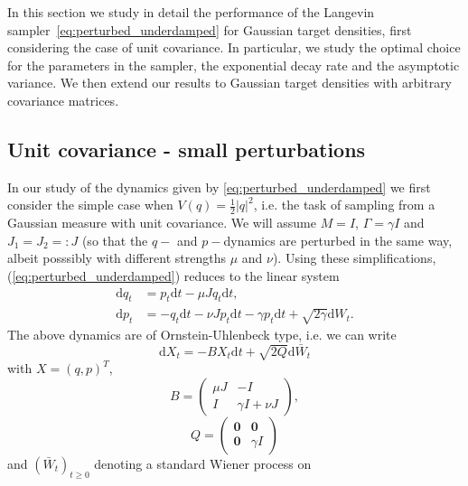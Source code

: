 
In this section we study in detail the performance of the Langevin sampler~\eqref{eq:perturbed_underdamped} for Gaussian target densities, first considering the case of unit covariance. In particular, we study the optimal choice for the parameters in the sampler, the exponential decay rate and the asymptotic variance. We then extend our results to Gaussian target densities with arbitrary covariance matrices.

\subsection{Unit covariance - small perturbations}
\label{sec:small perturbations}

In our study of the dynamics given by \eqref{eq:perturbed_underdamped}
we first consider the simple case when $V(q)=\frac{1}{2}\vert q\vert^{2}$,
i.e. the task of sampling from a Gaussian measure with unit covariance.
We will assume $M=I$, $\Gamma=\gamma I$ and $J_{1}=J_{2}=:J$
(so that the $q-$ and $p-$dynamics are perturbed in the same way,
albeit posssibly with different strengths $\mu$ and $\nu$). Using
these simplifications, (\ref{eq:perturbed_underdamped})
reduces to the linear system 
\begin{align}
\mathrm{d}q_{t} & =p_{t}\mathrm{d}t-\mu Jq_{t}\mathrm{d}t\nonumber, \\
\mathrm{d}p_{t} & =-q_{t}\mathrm{d}t-\nu Jp_{t}\mathrm{d}t-\gamma p_{t}\mathrm{d}t+\sqrt{2\gamma}\mathrm{d}W_{t}.\label{eq:unit covariance}
\end{align}
The above dynamics are of Ornstein-Uhlenbeck type, i.e. we can write
\begin{equation}
\mathrm{d}X_{t}=-BX_{t}\mathrm{d}t+\sqrt{2Q}\mathrm{d}\bar{W}_{t}\label{eq:OU process}
\end{equation}
with $X=(q,p)^{T}$, 
\begin{equation}
B=\left(\begin{array}{cc}
\mu J & -I\\
I & \gamma I+\nu J
\end{array}\right),\label{eq:drift matrix}
\end{equation}
\begin{equation}
Q=\left(\begin{array}{cc}
\boldsymbol{0} & \boldsymbol{0}\\
\boldsymbol{0} & \gamma I
\end{array}\right)\label{eq:diffusion matrix}
\end{equation}
and $(\bar{W}_{t})_{t\ge0}$ denoting a standard Wiener process on

